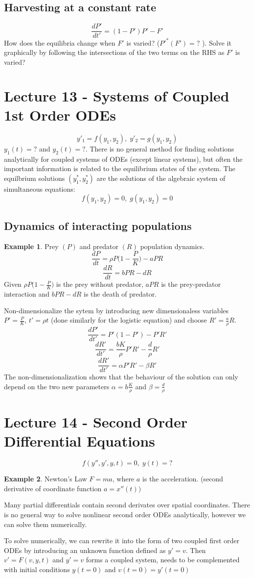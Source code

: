 \documentclass[a6paper]{article}
\theoremstyle{definition}
\newtheorem{example}{Example}
\theoremstyle{plain}
\theoremstyle{remark}
\begin{document}
\subsection{Harvesting at a constant rate}
$$ \frac{dP'}{dt'} = (1-P')P' - F' $$
How does the equilibria change when $ F' $ is varied? ($P'^*(F') = ? $ ). Solve
it graphically by following the intersections of the two terms on the RHS as
$ F' $ is varied?

\section{Lecture 13 - Systems of Coupled 1st Order ODEs}
$$ y'_1 = f(y_1,y_2), \; y'_2 = g(y_1, y_2) $$
$ y_1(t) = ? $ and $ y_2(t) = ? $. There is no general method for finding
solutions analytically for coupled systems of ODEs (except linear systems), but
often the important information is related to the equilibrium states of the
system. The equilbrium solutions $ (y_1^*, y_2^*) $ are the solutions of the
algebraic system of simultaneous equations:
$$ f(y_1, y_2) = 0 , \; g(y_1, y_2)  = 0 $$
\subsection{Dynamics of interacting populations}
\begin{example}
  Prey $ (P) $ and predator $ (R) $ population dynamics.
  $$ \frac{dP}{dt} = \rho P \Big (1 - \frac{P}{K}\Big) - aPR $$
  $$ \frac{dR}{dt} = bPR - dR $$
  Given $ \displaystyle \rho P\Big ( 1 - \frac{P}{K}\Big ) $ is the prey without predator,
  $ aPR $ is the prey-predator interaction and $ bPR - dR $ is the death of
  predator.
\end{example}
Non-dimensionalize the sytem by introducing new dimensionaless variables $ P'
= \displaystyle \frac{P}{K} $, $ t' = \rho t $ (done similarly for the logistic equation) and
choose $ R' = \displaystyle \frac{a}{\rho} R$. 
$$ \frac{dP'}{dt'} = P'(1-P') - P'R' $$
$$ \frac{dR'}{dt'} = \frac{bK}{\rho} P'R' - \frac{d}{\rho} R' $$
$$ \frac{dR'}{dt'} = \alpha P' R' - \beta R' $$
The non-dimensionalization shows that the behaviour of the solution can only
depend on the two new parameters $ \alpha = b \displaystyle \frac{K}{\rho}
$ and $ \beta = \displaystyle \frac{d}{\rho} $
\section{Lecture 14 - Second Order Differential Equations}
$$ f(y'', y', y,t) = 0, \; y(t) = ?$$
\begin{example}
  Newton's Law $ F = ma $, where $ a $ is the acceleration. (second derivative
  of coordinate function $ a = x''(t)) $
\end{example}
Many partial differentials contain second derivates over spatial coordinates.
There is no general way to solve nonlinear second order ODEs analytically,
however we can solve them numerically.
\par 
To solve numerically, we can rewrite it into the form of two coupled first
order ODEs by introducing an unknown function defined as $ y' = v $. Then $ v'
= F(v,y,t)$ and $ y' = v $ forms a coupled system, needs to be complemented
with initial conditions $ y(t=0)$ and $ v(t=0) = y'(t=0) $
\end{document}
